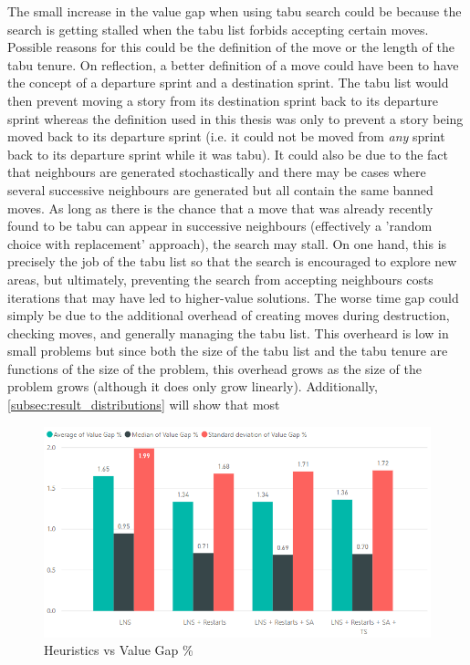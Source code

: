 The small increase in the value gap when using tabu search could be because the search is getting stalled when the tabu list forbids accepting certain moves. Possible reasons for this could be the definition of the move or the length of the tabu tenure. On reflection, a better definition of a move could have been to have the concept of a departure sprint and a destination sprint. The tabu list would then prevent moving a story from its destination sprint back to its departure sprint whereas the definition used in this thesis was only to prevent a story being moved back to its departure sprint (i.e. it could not be moved from \emph{any} sprint back to its departure sprint while it was tabu). It could also be due to the fact that neighbours are generated stochastically and there may be cases where several successive neighbours are generated but all contain the same banned moves. As long as there is the chance that a move that was already recently found to be tabu can appear in successive neighbours (effectively a 'random choice with replacement' approach), the search may stall. On one hand, this is precisely the job of the tabu list so that the search is encouraged to explore new areas, but ultimately, preventing the search from accepting neighbours costs iterations that may have led to higher-value solutions. The worse time gap could simply be due to the additional overhead of creating moves during destruction, checking moves, and generally managing the tabu list. This overheard is low in small problems but since both the size of the tabu list and the tabu tenure are functions of the size of the problem, this overhead grows as the size of the problem grows (although it does only grow linearly). Additionally, \cref{subsec:result_distributions} will show that most 

\begin{figure}[h!]
    \centering
    \includegraphics[width=\textwidth]{Figures/Metaheuristics/value_gap_perc_vs_heuristic.png}
    \caption{Heuristics vs Value Gap \%}
    \label{fig:value_gap_perc_vs_heuristic}
\end{figure}


